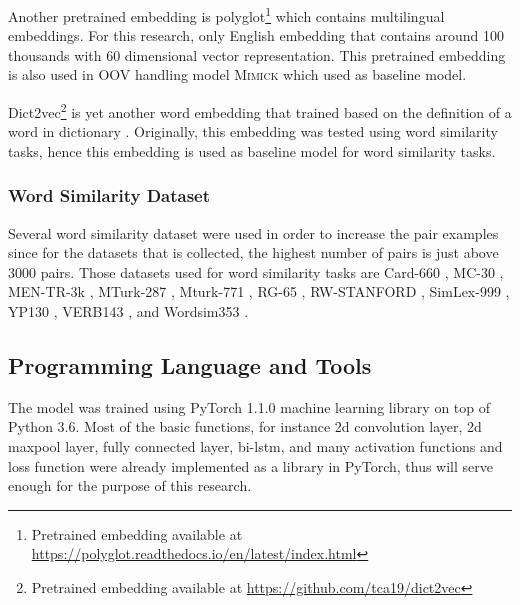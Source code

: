             Another pretrained embedding is
            polyglot\footnote{Pretrained embedding available at
            \url{https://polyglot.readthedocs.io/en/latest/index.html}}
            \citep{polyglot2013alrfou} which contains multilingual
            embeddings. For this research, only English embedding that
            contains around 100 thousands with 60 dimensional vector
            representation. This pretrained embedding is also used in OOV
            handling model \textsc{Mimick} \citep{mimicking2017Pinter} which
            used as baseline model.

            Dict2vec\footnote{Pretrained embedding available at
            \url{https://github.com/tca19/dict2vec}} is yet another word
            embedding that trained based on the definition of a word in
            dictionary \citep{dict2vect2017tissier}. Originally, this
            embedding was tested using word similarity tasks, hence this
            embedding is used as baseline model for word similarity tasks.

        \subsubsection{Word Similarity Dataset}
            Several word similarity dataset were used in order to
            increase the pair examples since for the datasets that is
            collected, the highest number of pairs is just above 3000
            pairs. Those datasets used for word similarity tasks are
            Card-660 \citep{card660:pilehvar-etal:2018}, MC-30
            \citep{mc30:strongContextualHypothesis}, MEN-TR-3k
            \citep{mentr3k:bruni-etal-2012-distributional}, MTurk-287
            \citep{mturk287:Radinsky:2011:WTC:1963405.1963455},
            Mturk-771
            \citep{mturk771:Halawi:2012:LLW:2339530.2339751}, RG-65
            \citep{rg65:Rubenstein:1965:CCS:365628.365657},
            RW-STANFORD \citep{rw:luong-etal-2013-better}, SimLex-999
            \citep{simlex999:hill2014}, YP130
            \citep{yp130:inproceedings}, VERB143
            \citep{vp143:baker-etal-2014-unsupervised}, and Wordsim353
            \citep{wordsim353:2002:PSC:503104.503110}.

    \subsection{Programming Language and Tools}
        The model was trained using PyTorch 1.1.0 machine learning
        library \citep{pytorch2017paszke} on top of Python 3.6. Most
        of the basic functions, for instance 2d convolution layer, 2d
        maxpool layer, fully connected layer, bi-lstm, and many
        activation functions and loss function were already
        implemented as a library in PyTorch, thus will serve enough
        for the purpose of this research.
            
